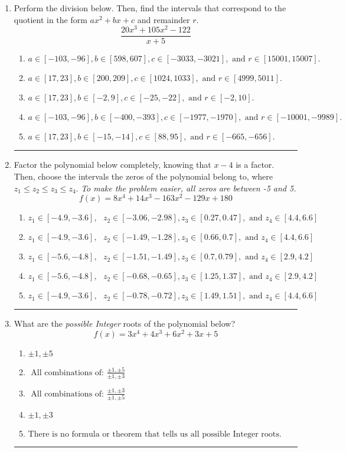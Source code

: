 \documentclass[14pt]{extbook}
\newcommand{\litem}[1]{\item#1\hspace*{-1cm}\rule{\textwidth}{0.4pt}}
\begin{document}
\begin{enumerate}
{\begin{enumerate}[label=\Alph*.]
\end{enumerate} }
\litem{
Perform the division below. Then, find the intervals that correspond to the quotient in the form $ax^2+bx+c$ and remainder $r$.\[ \frac{20x^{3} +105 x^{2} -122}{x + 5} \]\begin{enumerate}[label=\Alph*.]
\item \( a \in [-103, -96], b \in [598, 607], c \in [-3033, -3021], \text{ and } r \in [15001, 15007]. \)
\item \( a \in [17, 23], b \in [200, 209], c \in [1024, 1033], \text{ and } r \in [4999, 5011]. \)
\item \( a \in [17, 23], b \in [-2, 9], c \in [-25, -22], \text{ and } r \in [-2, 10]. \)
\item \( a \in [-103, -96], b \in [-400, -393], c \in [-1977, -1970], \text{ and } r \in [-10001, -9989]. \)
\item \( a \in [17, 23], b \in [-15, -14], c \in [88, 95], \text{ and } r \in [-665, -656]. \)

\end{enumerate} }
\litem{
Factor the polynomial below completely, knowing that $x -4$ is a factor. Then, choose the intervals the zeros of the polynomial belong to, where $z_1 \leq z_2 \leq z_3 \leq z_4$. \textit{To make the problem easier, all zeros are between -5 and 5.}\[ f(x) = 8x^{4} +14 x^{3} -163 x^{2} -129 x + 180 \]\begin{enumerate}[label=\Alph*.]
\item \( z_1 \in [-4.9, -3.6], \text{   }  z_2 \in [-3.06, -2.98], z_3 \in [0.27, 0.47], \text{   and   } z_4 \in [4.4, 6.6] \)
\item \( z_1 \in [-4.9, -3.6], \text{   }  z_2 \in [-1.49, -1.28], z_3 \in [0.66, 0.7], \text{   and   } z_4 \in [4.4, 6.6] \)
\item \( z_1 \in [-5.6, -4.8], \text{   }  z_2 \in [-1.51, -1.49], z_3 \in [0.7, 0.79], \text{   and   } z_4 \in [2.9, 4.2] \)
\item \( z_1 \in [-5.6, -4.8], \text{   }  z_2 \in [-0.68, -0.65], z_3 \in [1.25, 1.37], \text{   and   } z_4 \in [2.9, 4.2] \)
\item \( z_1 \in [-4.9, -3.6], \text{   }  z_2 \in [-0.78, -0.72], z_3 \in [1.49, 1.51], \text{   and   } z_4 \in [4.4, 6.6] \)

\end{enumerate} }
\litem{
What are the \textit{possible Integer} roots of the polynomial below?\[ f(x) = 3x^{4} +4 x^{3} +6 x^{2} +3 x + 5 \]\begin{enumerate}[label=\Alph*.]
\item \( \pm 1,\pm 5 \)
\item \( \text{ All combinations of: }\frac{\pm 1,\pm 5}{\pm 1,\pm 3} \)
\item \( \text{ All combinations of: }\frac{\pm 1,\pm 3}{\pm 1,\pm 5} \)
\item \( \pm 1,\pm 3 \)
\item \( \text{There is no formula or theorem that tells us all possible Integer roots.} \)


\end{enumerate}}
\end{enumerate}
\end{document}

